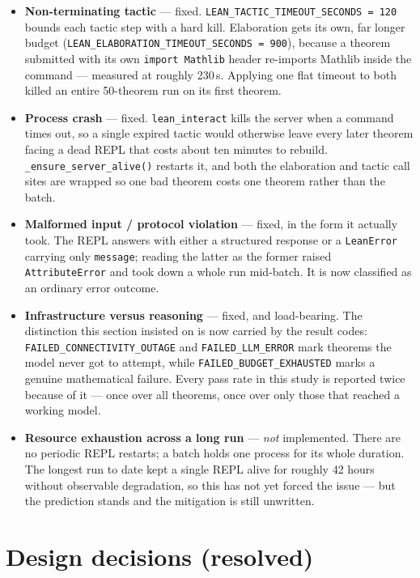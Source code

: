 \begin{itemize}
  \item \textbf{Non-terminating tactic} --- fixed. \texttt{LEAN\_TACTIC\_TIMEOUT\_SECONDS = 120} bounds each tactic step with a hard kill. Elaboration gets its own, far longer budget (\texttt{LEAN\_ELABORATION\_TIMEOUT\_SECONDS = 900}), because a theorem submitted with its own \texttt{import Mathlib} header re-imports Mathlib inside the command --- measured at roughly 230\,s. Applying one flat timeout to both killed an entire 50-theorem run on its first theorem.
  \item \textbf{Process crash} --- fixed. \texttt{lean\_interact} kills the server when a command times out, so a single expired tactic would otherwise leave every later theorem facing a dead REPL that costs about ten minutes to rebuild. \texttt{\_ensure\_server\_alive()} restarts it, and both the elaboration and tactic call sites are wrapped so one bad theorem costs one theorem rather than the batch.
  \item \textbf{Malformed input / protocol violation} --- fixed, in the form it actually took. The REPL answers with either a structured response or a \texttt{LeanError} carrying only \texttt{message}; reading the latter as the former raised \texttt{AttributeError} and took down a whole run mid-batch. It is now classified as an ordinary error outcome.
  \item \textbf{Infrastructure versus reasoning} --- fixed, and load-bearing. The distinction this section insisted on is now carried by the result codes: \texttt{FAILED\_CONNECTIVITY\_OUTAGE} and \texttt{FAILED\_LLM\_ERROR} mark theorems the model never got to attempt, while \texttt{FAILED\_BUDGET\_EXHAUSTED} marks a genuine mathematical failure. Every pass rate in this study is reported twice because of it --- once over all theorems, once over only those that reached a working model.
  \item \textbf{Resource exhaustion across a long run} --- \emph{not} implemented. There are no periodic REPL restarts; a batch holds one process for its whole duration. The longest run to date kept a single REPL alive for roughly 42 hours without observable degradation, so this has not yet forced the issue --- but the prediction stands and the mitigation is still unwritten.
\end{itemize}

\section{Design decisions (resolved)}

